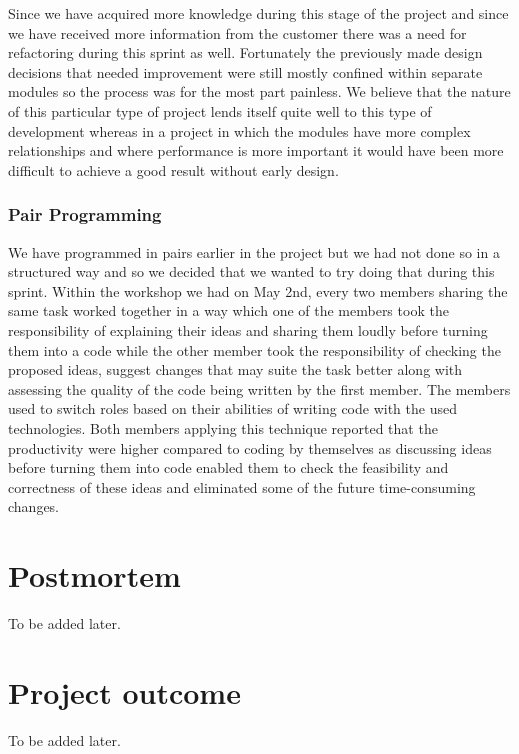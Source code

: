 \documentclass[14]{article}
\begin{document}
Since we have acquired more knowledge during this stage of the project and since we have received more information from the customer there was a need for refactoring during this sprint as well. Fortunately the previously made design decisions that needed improvement were still mostly confined within separate modules so the process was for the most part painless. We believe that the nature of this particular type of project lends itself quite well to this type of development whereas in a project in which the modules have more complex relationships and where performance is more important it would have been more difficult to achieve a good result without early design. 

\subsubsection{Pair Programming}

We have programmed in pairs earlier in the project but we had not done so in a structured way and so we decided that we wanted to try doing that during this sprint. Within the workshop we had on May 2nd, every two members sharing the same task worked together in a way which one of the members took the responsibility of explaining their ideas and sharing them loudly before turning them into a code while the other member took the responsibility of checking the proposed ideas, suggest changes that may suite the task better along with assessing the quality of the code being written by the first member. The members used to switch roles based on their abilities of writing code with the used technologies. Both members applying this technique reported that the productivity were higher compared to coding by themselves as discussing ideas before turning them into code enabled them to check the feasibility and correctness of these ideas and eliminated some of the future time-consuming changes.   


\section{Postmortem}
To be added later.

\section{Project outcome}
To be added later.
\end{document}
